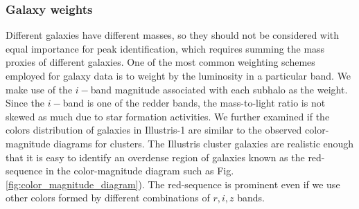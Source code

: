 \subsubsection{Galaxy weights}
\label{subsubsec:galaxy_weights}

Different galaxies have different masses, so they should not be considered with equal
importance for peak identification, which requires summing
the mass proxies of different galaxies. 
One of the most common weighting schemes employed for galaxy data is to weight
by the luminosity in a particular band. We make use of the $i-$band magnitude
associated with each subhalo as the weight. Since the $i-$band is
one of the redder bands, the mass-to-light ratio is not skewed as much due to star
formation activities. 
We further examined if the colors distribution of galaxies in Illustris-1 are
similar to the observed color-magnitude diagrams for clusters.
The Illustris cluster galaxies are realistic enough that it is easy to
identify an overdense region of galaxies known as the red-sequence in the 
color-magnitude diagram such as Fig.
\ref{fig:color_magnitude_diagram}). The red-sequence is prominent even if we
use other colors formed by different combinations of $r, i, z$ bands.

